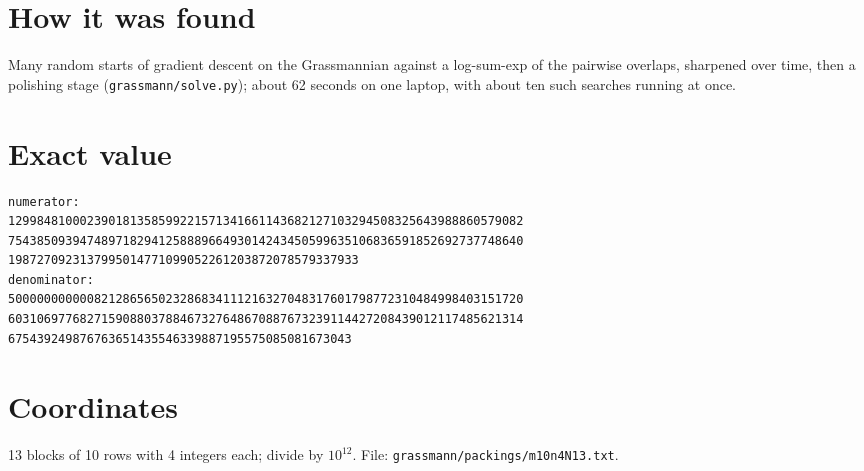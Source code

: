 \documentclass[11pt,a4paper]{article}
\begin{document}
\section{How it was found}
Many random starts of gradient descent on the Grassmannian against a log-sum-exp of the pairwise overlaps, sharpened over time, then a polishing stage (\texttt{grassmann/solve.py}); about 62 seconds on one laptop, with about ten such searches running at once.


\appendix
\section{Exact value}
{\small
\begin{verbatim}
numerator:
129984810002390181358599221571341661143682127103294508325643988860579082
754385093947489718294125888966493014243450599635106836591852692737748640
1987270923137995014771099052261203872078579337933
denominator:
500000000000821286565023286834111216327048317601798772310484998403151720
603106977682715908803788467327648670887673239114427208439012117485621314
675439249876763651435546339887195575085081673043
\end{verbatim}}

\section{Coordinates}
13 blocks of 10 rows with 4 integers each; divide by $10^{12}$. File: \texttt{grassmann/packings/m10n4N13.txt}.
{\tiny
\begin{multicols}{3}
\end{multicols}}
\end{document}
